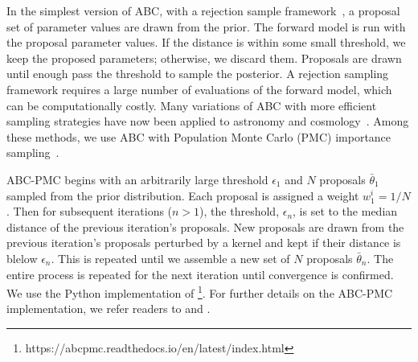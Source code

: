 In the simplest version of ABC, with a rejection sample
framework~\citep{pritchard1999}, a proposal set of parameter values are drawn
from the prior. The forward model is run with the proposal parameter values.
If the distance is within some small threshold, we keep the proposed
parameters; otherwise, we discard them.  Proposals are
drawn until enough pass the threshold to sample the posterior. A
rejection sampling framework requires a large number of evaluations of the
forward model, which
can be computationally costly. Many variations of ABC with more efficient
sampling strategies have now been applied to astronomy and
cosmology~\citep[\eg][]{cameron2012, weyant2013, ishida2015, lin2016, alsing2018}.
Among these methods, we use ABC with Population Monte Carlo (PMC) 
importance sampling~\citep{hahn2017a, hahn2017b, hahn2019a}.

ABC-PMC begins with an arbitrarily large threshold $\epsilon_1$ and $N$ proposals 
$\bar{\theta}_1$ sampled from the prior distribution. Each proposal is
assigned a weight $w^i_1 = 1/N$. Then for subsequent iterations ($n > 1$), the 
threshold, $\epsilon_n$, is set to the median distance of the previous iteration's
proposals. New proposals are drawn from the previous iteration's proposals perturbed 
by a kernel and kept if their distance is blelow $\epsilon_n$. This is repeated
until we assemble a new set of $N$ proposals $\bar{\theta}_n$. The entire
process is repeated for the next iteration until convergence is confirmed. 
We use the Python implementation of
\cite{akeret2015}\footnote{https://abcpmc.readthedocs.io/en/latest/index.html}.
For further details on the ABC-PMC implementation, we refer readers to \cite{hahn2017b}
and \cite{hahn2019a}.

